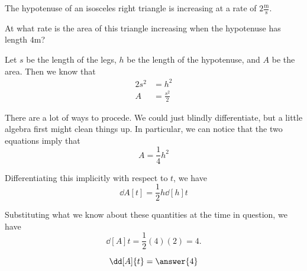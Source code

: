 \documentclass{ximera}
\author{Steven Gubkin}
\begin{document}
\begin{exercise}



The hypotenuse of an isosceles right triangle is increasing at a rate
of $2 \frac{\textrm{m}}{\textrm{s}}$.

At what rate is the area of this triangle increasing when the
hypotenuse has length $4 \textrm{m}$?

\begin{hint}
  Let $s$ be the length of the legs, $h$ be the length of the
  hypotenuse, and $A$ be the area.  Then we know that
\begin{align*}
	2s^2 &= h^2\\
	A &=\frac{s^2}{2}
\end{align*}
\end{hint}

\begin{hint}
  There are a lot of ways to procede.  We could just blindly
  differentiate, but a little algebra first might clean things up.  In
  particular, we can notice that the two equations imply that
\[
A = \frac{1}{4} h^2
\]
\end{hint}

\begin{hint}
  Differentiating this implicitly with respect to $t$, we have
\[
\dd{A}[t] = \frac{1}{2} h \dd[h]{t}
\]
\end{hint}

\begin{hint}
  Substituting what we know about these quantities at the time in
  question, we have
  \[
  \dd[A]{t} = \frac{1}{2} (4) (2) = 4.
  \]
\end{hint}

\begin{prompt}
  \[
  \dd[A]{t} = \answer{4}
  \]
\end{prompt}
\end{exercise}
\end{document}
